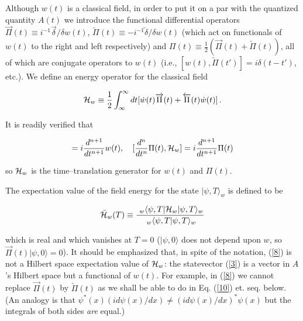 \documentclass{article}
\begin{document}
\hspace{\parindent}Although $w(t)$ is a classical field, in order to put it on a par with 
 the quantized quantity $A(t)$ we introduce the functional differential 
 operators $\overrightarrow\Pi (t)\equiv i^{-1}\overrightarrow\delta /\delta w(t)$, 
 $\overleftarrow\Pi (t)\equiv -i^{-1}\overleftarrow\delta /\delta w(t)$ (which 
 act on functionals of $w(t)$ to the right 
 and left respectively) and
 $\Pi (t)\equiv\frac{1}{2} (\overrightarrow\Pi (t) + \overleftarrow\Pi (t))$, all of 
 which are conjugate operators to $w(t)$ (i.e., 
 $[w(t),\overleftarrow\Pi (t')]=i\delta (t-t')$, etc.). We define an energy 
 operator for the classical field 
 
  \begin{equation}\label{7}
{\cal H}_{w}\equiv \frac{1}{2}\int_{\infty}^{\infty}dt
[\dot{w}(t)\overrightarrow\Pi (t) + \overleftarrow\Pi (t)\dot{w}(t)]\, .
\end{equation}

	It is readily verified that 
	
\begin{displaymath}
[\frac{d^{n}}{dt^{n}}w(t),{\cal H}_{w}]=i\frac{d^{n+1}}{dt^{n+1}}w(t),\quad 
[\frac{d^{n}}{dt^{n}}\Pi (t),{\cal H}_{w}]=i\frac{d^{n+1}}{dt^{n+1}}\Pi (t) 	
\end{displaymath}

\noindent so ${\cal H}_{w}$ is the time--translation generator for $w(t)$ and $\Pi (t)$.  

	The expectation value of the field energy for the state $|\psi,T\rangle _{w}$ is defined to be 
	
\begin{equation}\label{8}
\bar{\cal H}_{w}(T)\equiv \frac{\ _{w}\langle \psi,T|{\cal H}_{w}|\psi,T\rangle _{w}}
{\ _{w}\langle \psi,T|\psi,T\rangle _{w}}
\end{equation}

\noindent which is real and which 
vanishes at $T=0$ ($|\psi,0\rangle$ does not depend upon $w$,  
so $\overrightarrow\Pi (t)|\psi,0\rangle =0$). It 
should be emphasized that, in spite of the notation, (\ref{8}) is
not a Hilbert space expectation value of ${\cal H}_{w}$: the statevector (\ref{3}) is a vector in $A$'s 
Hilbert space but a functional of $w(t)$.  For example, in (\ref{8}) we cannot 
replace $\overrightarrow\Pi (t)$ by $\overleftarrow\Pi (t)$ as we shall be able to 
do in Eq. (\ref{10}) et. seq. below.  (An analogy is that $\psi^{*}(x)(id\psi(x)/dx)\neq (id\psi(x)/dx)^{*}\psi(x)$ 
but the integrals of both sides {\it are} equal.)
\end{document}
